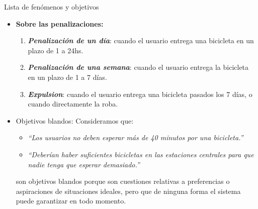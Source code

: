 \begin{subsection}{Lista de fenómenos y objetivos}
\begin{itemize}
\begin{enumerate}
\item Cualquier persona puede comprobar online disponibilidad de bicicletas para cualquiera de las estaciones.
\item El usuario solicita a empleado de una estación una bicicleta.
\item El empleado consulta disponibilidad de bicicletas.
\item El empleado valida al usuario y su reputación (penalizado/no penalizado).
\item El empleado actualiza sistema (con el nuevo número de bicicletas, las que están en uso, estado del usuario).
\item El empleado entrega bicicleta al usuario.
\item Ante déficit de bicicletas en una o varias estaciones, el sistema determinará qué bicicletas desplazar de una estación a otra, según número de unidades en cada estación, bicicletas en uso y su destino, etc.
\item El sistema almacenará los datos de todos los movimientos para estadísticas.
\end{enumerate}

\item \textbf{Sobre las penalizaciones:}

\begin{enumerate}
\item \textbf{\emph{Penalización de un día}}: cuando el usuario entrega una bicicleta en un plazo de 1 a 24hs.
\item \textbf{\emph{Penalización de una semana}}: cuando el usuario entrega la bicicleta en un plazo de 1 a 7 días.
\item \textbf{\emph{Expulsion}}: cuando el usuario entrega una bicicleta pasados los 7 días, o cuando directamente la roba.
\end{enumerate}


\item{Objetivos blandos}:
Consideramos que:
\begin{itemize}
\item \emph{``Los usuarios no deben esperar más de 40 minutos por una bicicleta.''}
\item \emph{``Deberían haber suficientes bicicletas en las estaciones centrales para que nadie tenga que esperar demasiado.''}
\end{itemize}

son objetivos blandos porque son cuestiones relativas a preferencias o aspiraciones de situaciones ideales, pero que de ninguna forma el sistema puede garantizar en todo momento.

\end{itemize}
\end{subsection} 
